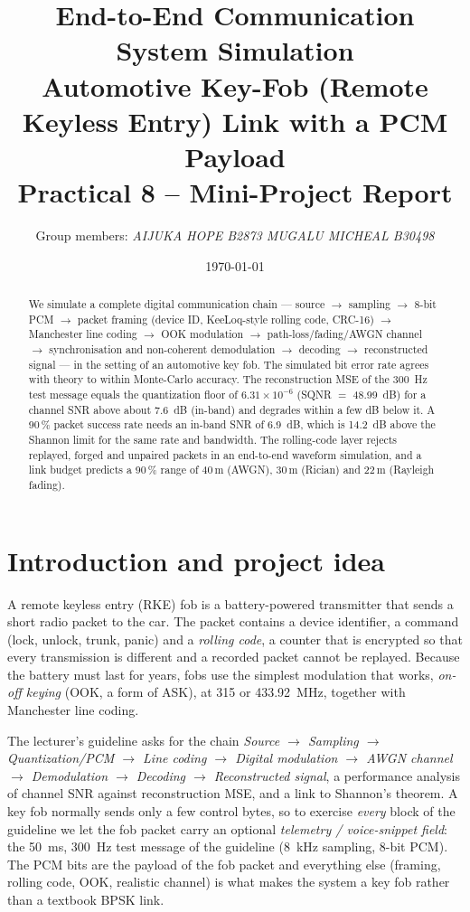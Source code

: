 \documentclass[11pt,a4paper]{article}
\title{\textbf{End-to-End Communication System Simulation}\\[2pt]
\large Automotive Key-Fob (Remote Keyless Entry) Link with a PCM Payload\\[2pt]
\normalsize Practical 8 -- Mini-Project Report}
\author{Group members: \textit{AIJUKA HOPE B2873  MUGALU MICHEAL B30498}}
\date{\today}
\begin{document}
\maketitle
\begin{abstract}
We simulate a complete digital communication chain --- source $\to$ sampling $\to$ 8-bit PCM $\to$ packet framing
(device ID, KeeLoq-style rolling code, CRC-16) $\to$ Manchester line coding $\to$ OOK modulation $\to$ path-loss/fading/AWGN channel
$\to$ synchronisation and non-coherent demodulation $\to$ decoding $\to$ reconstructed signal --- in the setting of an automotive key fob.
The simulated bit error rate agrees with theory to within Monte-Carlo accuracy. The reconstruction MSE of the 300~Hz test message equals the quantization floor
of $6.31\times10^{-6}$ (SQNR $=$ 48.99~dB) for a channel SNR above about 7.6~dB (in-band) and degrades within a few dB below it.
A 90\,\% packet success rate needs an in-band SNR of 6.9~dB, which is 14.2~dB above the Shannon limit for the same rate and bandwidth.
The rolling-code layer rejects replayed, forged and unpaired packets in an end-to-end waveform simulation, and a link budget predicts a 90\,\% range of
40\,m (AWGN), 30\,m (Rician) and 22\,m (Rayleigh fading).
\end{abstract}

\tableofcontents
\newpage

\section{Introduction and project idea}
A remote keyless entry (RKE) fob is a battery-powered transmitter that sends a short radio packet to the car. The packet contains a device
identifier, a command (lock, unlock, trunk, panic) and a \emph{rolling code}, a counter that is encrypted so that every transmission is different and a
recorded packet cannot be replayed. Because the battery must last for years, fobs use the simplest modulation that works, \emph{on-off keying} (OOK, a form of ASK),
at 315 or 433.92~MHz, together with Manchester line coding.

The lecturer's guideline asks for the chain \emph{Source $\to$ Sampling $\to$ Quantization/PCM $\to$ Line coding $\to$ Digital modulation $\to$ AWGN channel
$\to$ Demodulation $\to$ Decoding $\to$ Reconstructed signal}, a performance analysis of channel SNR against reconstruction MSE, and a link to Shannon's theorem.
A key fob normally sends only a few control bytes, so to exercise \emph{every} block of the guideline we let the fob packet carry an optional
\emph{telemetry / voice-snippet field}: the 50~ms, 300~Hz test message of the guideline (8~kHz sampling, 8-bit PCM). The PCM bits are the payload of the fob packet and
everything else (framing, rolling code, OOK, realistic channel) is what makes the system a key fob rather than a textbook BPSK link.
\end{document}
